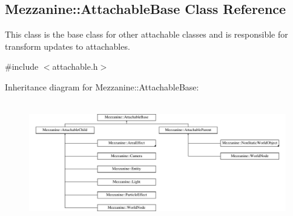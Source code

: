 \hypertarget{classMezzanine_1_1AttachableBase}{
\subsection{Mezzanine::AttachableBase Class Reference}
\label{classMezzanine_1_1AttachableBase}
}


This class is the base class for other attachable classes and is responsible for transform updates to attachables.  




{\ttfamily \#include $<$attachable.h$>$}

Inheritance diagram for Mezzanine::AttachableBase:\begin{figure}[H]
\begin{center}
\leavevmode
\includegraphics[height=5.308057cm]{classMezzanine_1_1AttachableBase}
\end{center}
\end{figure}
